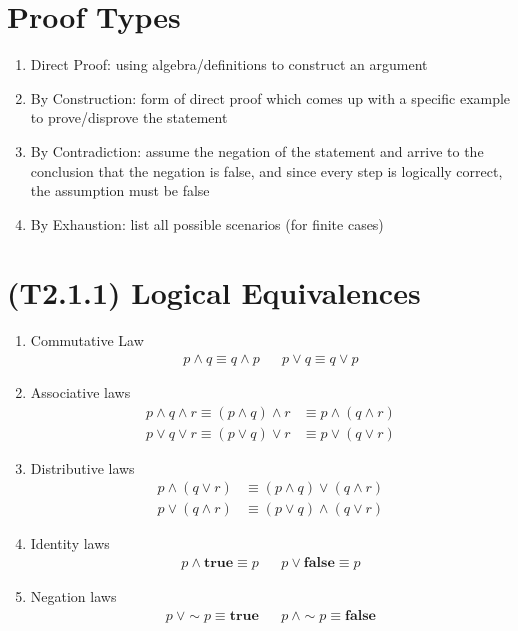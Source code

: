 \documentclass[landscape, a4paper]{article}
\newcommand{\Or}{\vee}
\newcommand{\true}{\textbf{true}}
\newcommand{\false}{\textbf{false}}
\renewcommand{\and}{\wedge}
\newcommand{\customsection}[1]{%
    \vspace*{-16pt}%
    \section*{#1}%
    \vspace*{-5pt}%
}
\begin{document}
\begin{multicols*}{4}
    \customsection{Proof Types}
    \begin{enumerate}[wide, labelindent=2pt]
        \item Direct Proof: using algebra/definitions to construct an argument
        \item By Construction: form of direct proof which comes up with a specific example to prove/disprove the statement
        \item By Contradiction: assume the negation of the statement and arrive to the conclusion that the negation is false, and since every step is logically correct, the assumption must be false
        \item By Exhaustion: list all possible scenarios (for finite cases)
    \end{enumerate}

    \customsection{(T2.1.1) Logical Equivalences}
    \begin{enumerate}[wide, labelindent=2pt]
        \item Commutative Law
              \begin{align*}
                  p \and q\equiv q \and p &  & p \Or q\equiv q \Or p
              \end{align*}
        \item Associative laws
              \begin{align*}
                  p \and q \and r \equiv (p \and q) \and r & \equiv p \and (q \and r) \\
                  p \Or q \Or r \equiv (p \Or q) \Or r     & \equiv p \Or (q \Or r)
              \end{align*}
        \item Distributive laws
              \begin{align*}
                  p \and (q \Or r) & \equiv (p \and q) \Or (q \and r) \\
                  p \Or (q \and r) & \equiv (p \Or q) \and (q \Or r)
              \end{align*}
        \item Identity laws
              \begin{align*}
                  p \and \true \equiv p &  & p \Or \false  \equiv p
              \end{align*}
        \item Negation laws
              \begin{align*}
                  p\ \Or {\sim} p\equiv \true &  & p\ \and {\sim} p  \equiv \false
              \end{align*}

\end{enumerate}
\end{multicols*}
\end{document}
